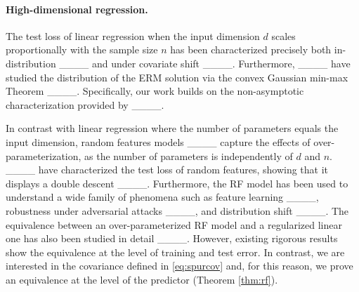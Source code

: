 \vspace{-0.2cm}

\paragraph{High-dimensional regression.}
The test loss of linear regression when the input dimension $d$ scales proportionally with the sample size $n$ has been 
characterized precisely both in-distribution  ____ and under covariate shift ____. Furthermore, 
____ have studied the distribution of the ERM solution via %
the convex Gaussian min-max Theorem %
____. %
Specifically, our work builds on the non-asymptotic characterization provided by ____. 

\vspace{-0.1cm}

In contrast with linear regression where the number of parameters equals the input dimension, random features models ____ %
capture the effects of over-parameterization, as the number of parameters is independently of $d$ and $n$.
____ have characterized the test loss of random features, showing that it displays a double descent ____. Furthermore, the RF model has been used to understand a wide family of phenomena such as feature learning ____, robustness under adversarial attacks ____, and distribution shift ____. The equivalence between an over-parameterized RF model and a regularized linear one has also been studied in detail %
____. However, existing rigorous results show the equivalence at the level of training and test error. In contrast, we are interested in the covariance defined in \eqref{eq:spurcov} and, for this reason, we prove an equivalence at the level of the predictor (Theorem \ref{thm:rf}). %



